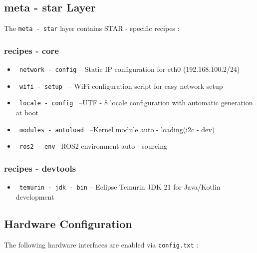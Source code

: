     \subsection{meta - star Layer}

        The \texttt{meta - star} layer contains STAR -
        specific recipes :

\subsubsection{recipes - core
   }

    \begin{itemize}
    \item \texttt { network - config} -- Static IP configuration for eth0 (192.168.100.2/24)
    \item \texttt{
      wifi - setup
   } -- WiFi configuration script for easy network setup
    \item \texttt{
      locale - config
   }
    --UTF - 8 locale configuration with automatic generation at boot
    \item \texttt {
      modules - autoload
   }
    --Kernel module auto - loading(i2c - dev)
    \item \texttt { ros2 - env}
    --ROS2 environment auto - sourcing
\end{itemize}

    \subsubsection{recipes - devtools}

    \begin{itemize}
    \item \texttt { temurin - jdk - bin} -- Eclipse Temurin JDK 21 for Java/Kotlin development
\end{itemize}

    \subsection{Hardware Configuration}

    The following hardware interfaces are enabled via \texttt{config.txt} :

